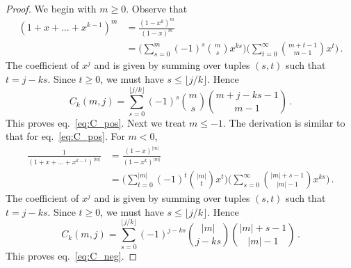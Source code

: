 \documentclass[review]{elsarticle}
\theoremstyle{plain}
\begin{document}
\begin{proof}
We begin with $m\ge0$.
Observe that
\begin{equation}
\begin{split}
  (1+x+\dots+x^{k-1})^m &= \frac{(1-x^k)^m}{(1-x)^m}
  \\
  &= \biggl(\sum_{s=0}^m (-1)^s\binom{m}{s}x^{ks}\biggr) \biggl(\sum_{t=0}^\infty \binom{m+t-1}{m-1} x^t \biggr) \,.
\end{split}
\end{equation}
The coefficient of $x^j$ and is given by summing over tuples $(s,t)$ such that $t = j-ks$.
Since $t\ge0$, we must have $s \le \lfloor j/k \rfloor$. Hence
\begin{equation}
  C_k(m,j) = \sum_{s=0}^{\lfloor j/k \rfloor} (-1)^s\binom{m}{s} \binom{m+j-ks-1}{m-1} \,.
\end{equation}
This proves eq.~\eqref{eq:C_pos}.
Next we treat $m\le-1$.
The derivation is similar to that for eq.~\eqref{eq:C_pos}. For $m<0$, 
\begin{equation}
\begin{split}
  \frac{1}{(1+x+\dots+x^{k-1})^{|m|}} &= \frac{(1-x)^{|m|}}{(1-x^k)^{|m|}}
  \\
  &= \biggl(\sum_{t=0}^{|m|}(-1)^t\binom{|m|}{t}x^t\biggr) \biggl(\sum_{s=0}^\infty \binom{|m|+s-1}{|m|-1}x^{ks}\biggr) \,.
\end{split}
\end{equation}
The coefficient of $x^j$ and is given by summing over tuples $(s,t)$ such that $t = j-ks$.
Since $t\ge0$, we must have $s \le \lfloor j/k \rfloor$. Hence
\begin{equation}
C_k(m,j) = \sum_{s=0}^{\lfloor j/k \rfloor} (-1)^{j-ks} \binom{|m|}{j-ks} \binom{|m|+s-1}{|m|-1} \,.
\end{equation}
This proves eq.~\eqref{eq:C_neg}.
\end{proof}

\end{document}
